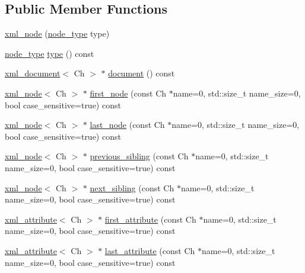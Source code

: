 \subsection*{Public Member Functions}
\begin{DoxyCompactItemize}
\item 
\hyperlink{classrapidxml_1_1xml__node_a8bd9019960b90605a45998b661fb1b0e}{xml\_\-node} (\hyperlink{namespacerapidxml_abb456db38f7efb746c4330eed6072a7c}{node\_\-type} type)
\item 
\hyperlink{namespacerapidxml_abb456db38f7efb746c4330eed6072a7c}{node\_\-type} \hyperlink{classrapidxml_1_1xml__node_a2c6a4315b98bcfa2e04fed3fa1b22c36}{type} () const 
\item 
\hyperlink{classrapidxml_1_1xml__document}{xml\_\-document}$<$ Ch $>$ $\ast$ \hyperlink{classrapidxml_1_1xml__node_adb6ad21a4590cf13d4a6a5036e3cdbbc}{document} () const 
\item 
\hyperlink{classrapidxml_1_1xml__node}{xml\_\-node}$<$ Ch $>$ $\ast$ \hyperlink{classrapidxml_1_1xml__node_a2dedeb4e04bb35e06a9a7bddf6ba652d}{first\_\-node} (const Ch $\ast$name=0, std::size\_\-t name\_\-size=0, bool case\_\-sensitive=true) const 
\item 
\hyperlink{classrapidxml_1_1xml__node}{xml\_\-node}$<$ Ch $>$ $\ast$ \hyperlink{classrapidxml_1_1xml__node_a2ace550c18cf10da6303773972d7157f}{last\_\-node} (const Ch $\ast$name=0, std::size\_\-t name\_\-size=0, bool case\_\-sensitive=true) const 
\item 
\hyperlink{classrapidxml_1_1xml__node}{xml\_\-node}$<$ Ch $>$ $\ast$ \hyperlink{classrapidxml_1_1xml__node_a001ece4e227eebbd6ad0ec7dacf1c00b}{previous\_\-sibling} (const Ch $\ast$name=0, std::size\_\-t name\_\-size=0, bool case\_\-sensitive=true) const 
\item 
\hyperlink{classrapidxml_1_1xml__node}{xml\_\-node}$<$ Ch $>$ $\ast$ \hyperlink{classrapidxml_1_1xml__node_ac59af4dd5f0ec715753e42467dff6aed}{next\_\-sibling} (const Ch $\ast$name=0, std::size\_\-t name\_\-size=0, bool case\_\-sensitive=true) const 
\item 
\hyperlink{classrapidxml_1_1xml__attribute}{xml\_\-attribute}$<$ Ch $>$ $\ast$ \hyperlink{classrapidxml_1_1xml__node_ae426802be58114ffc41bf30ac6b8c37d}{first\_\-attribute} (const Ch $\ast$name=0, std::size\_\-t name\_\-size=0, bool case\_\-sensitive=true) const 
\item 
\hyperlink{classrapidxml_1_1xml__attribute}{xml\_\-attribute}$<$ Ch $>$ $\ast$ \hyperlink{classrapidxml_1_1xml__node_a50c03f2db3fa51f27a73d86ec29a49d3}{last\_\-attribute} (const Ch $\ast$name=0, std::size\_\-t name\_\-size=0, bool case\_\-sensitive=true) const 

\end{DoxyCompactItemize}
